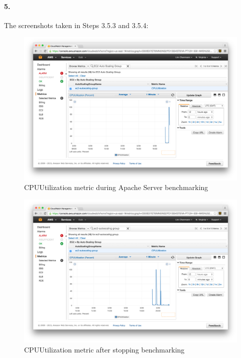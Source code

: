 \documentclass[a4paper]{article}
\begin{document}
\paragraph{5. } The screenshots taken in Steps 3.5.3 and 3.5.4:
\begin{figure}[H]
  \centering
    \includegraphics[scale=.34]{step_3_5_3.png}
  \caption{CPUUtilization metric during Apache Server benchmarking}
\end{figure}
\begin{figure}[H]
  \centering
    \includegraphics[scale=.34]{step_3_5_4.png}
  \caption{CPUUtilization metric after stopping benchmarking}
\end{figure}

\end{document}
